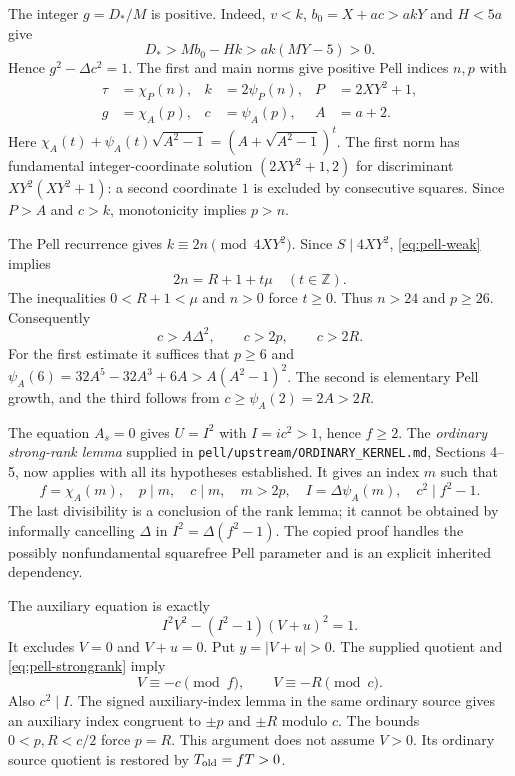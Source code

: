 The integer $g=D_*/M$ is positive. Indeed, $v<k$,
$b_0=X+ac>akY$ and $H<5a$ give
\[
 D_*>Mb_0-Hk>ak(MY-5)>0.
\]
Hence $g^2-\Delta c^2=1$. The first and main norms give positive Pell
indices $n,p$ with
\begin{align*}
 \tau&=\chi_{P}(n),&k&=2\psi_{P}(n),&P&=2XY^2+1,\\
 g&=\chi_A(p),&c&=\psi_A(p),&A&=a+2.
\end{align*}
Here $\chi_A(t)+\psi_A(t)\sqrt{A^2-1}
=(A+\sqrt{A^2-1})^t$. The first norm has fundamental integer-coordinate
solution $(2XY^2+1,2)$ for discriminant $XY^2(XY^2+1)$: a second
coordinate $1$ is excluded by consecutive squares. Since $P>A$ and $c>k$,
monotonicity implies $p>n$.

The Pell recurrence gives $k\equiv2n\pmod{4XY^2}$. Since $S\mid4XY^2$,
\eqref{eq:pell-weak} implies
\[
 2n=R+1+t\mu\quad(t\in\mathbb Z).
\]
The inequalities $0<R+1<\mu$ and $n>0$ force $t\ge0$. Thus $n>24$ and
$p\ge26$. Consequently
\begin{equation}
 c>A\Delta^2,\qquad c>2p,\qquad c>2R.
 \label{eq:pell-rankbounds}
\end{equation}
For the first estimate it suffices that $p\ge6$ and
$\psi_A(6)=32A^5-32A^3+6A>A(A^2-1)^2$. The second is elementary Pell
growth, and the third follows from $c\ge\psi_A(2)=2A>2R$.

The equation $A_s=0$ gives $U=I^2$ with $I=ic^2>1$, hence $f\ge2$.
The \emph{ordinary strong-rank lemma} supplied in
\texttt{pell/upstream/ORDINARY\_KERNEL.md}, Sections 4--5, now applies
with all its hypotheses established. It gives an index $m$ such that
\begin{equation}
 f=\chi_A(m),\quad p\mid m,\quad c\mid m,\quad m>2p,
 \quad I=\Delta\psi_A(m),\quad c^2\mid f^2-1.
 \label{eq:pell-strongrank}
\end{equation}
The last divisibility is a conclusion of the rank lemma; it cannot be
obtained by informally cancelling $\Delta$ in $I^2=\Delta(f^2-1)$.
The copied proof handles the possibly nonfundamental squarefree Pell
parameter and is an explicit inherited dependency.

The auxiliary equation is exactly
\[
 I^2V^2-(I^2-1)(V+u)^2=1.
\]
It excludes $V=0$ and $V+u=0$. Put $y=|V+u|>0$. The supplied quotient
and \eqref{eq:pell-strongrank} imply
\[
 V\equiv-c\pmod f,\qquad V\equiv-R\pmod c.
\]
Also $c^2\mid I$. The signed auxiliary-index lemma in the same ordinary
source gives an auxiliary index congruent to $\pm p$ and $\pm R$ modulo
$c$. The bounds $0<p,R<c/2$ force $p=R$. This argument does not assume
$V>0$. Its ordinary source quotient is restored by $T_{\rm old}=fT>0$.


